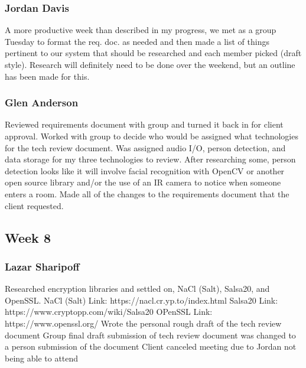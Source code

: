 \documentclass[onecolumn, draftclsnofoot,10pt, compsoc]{IEEEtran}
\newcommand\tab[1][1cm]{\hspace*{#1}}
\begin{document}
\subsubsection{Jordan Davis}
A more productive week than described in my progress, we met as a group Tuesday to format the req. doc. as needed and then made a list of things pertinent to our system that should be researched and each member picked (draft style). Research will definitely need to be done over the weekend, but an outline has been made for this.


\subsubsection{Glen Anderson}
Reviewed requirements document with group and turned it back in for client approval. Worked with group to decide who would be assigned what technologies for the tech review document. Was assigned audio I/O, person detection, and data storage for my three technologies to review. After researching some, person detection looks like it will involve facial recognition with OpenCV or another open source library and/or the use of an IR camera to notice when someone enters a room. Made all of the changes to the requirements document that the client requested. 

\subsection{Week 8}
\subsubsection{Lazar Sharipoff}
Researched encryption libraries and settled on, NaCl (Salt), Salsa20, and OpenSSL.
\newline \tab NaCl (Salt) Link:
\newline \tab \tab https://nacl.cr.yp.to/index.html
\newline \tab Salsa20 Link:
\newline \tab \tab https://www.cryptopp.com/wiki/Salsa20
\newline \tab OPenSSL Link:
\newline \tab \tab https://www.openssl.org/
\newline Wrote the personal rough draft of the tech review document
\newline Group final draft submission of tech review document was changed to a person submission of the document
\newline Client canceled meeting due to Jordan not being able to attend
\end{document}
